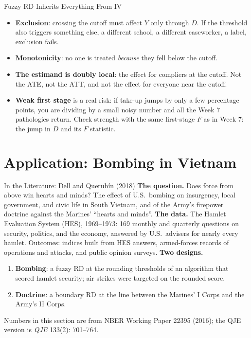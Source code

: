 \documentclass[aspectratio=169,11pt,xcolor=dvipsnames]{beamer}
\newcommand{\core}{\,\raisebox{0.6pt}{\textcolor{corestar}{$\bigstar$}}}
\begin{document}
\begin{frame}{Fuzzy RD Inherits Everything From IV\core}
\begin{itemize}\itemsep3pt
  \item \textbf{Exclusion}: crossing the cutoff must affect $Y$ only through $D$.
        If the threshold also triggers something else, a different school, a
        different caseworker, a label, exclusion fails.
  \item \textbf{Monotonicity}: no one is treated \emph{because} they fell below
        the cutoff.
  \item \textbf{The estimand is doubly local}: the effect for \alert{compliers at
        the cutoff}. Not the ATE, not the ATT, and not the effect for everyone
        near the cutoff.
  \item \textbf{Weak first stage} is a real risk: if take-up jumps by only a few
        percentage points, you are dividing by a small noisy number and all the
        Week 7 pathologies return. Check strength with the same first-stage $F$
        as in Week 7: the jump in $D$ and its $F$ statistic.
\end{itemize}
\end{frame}

\section[Vietnam]{Application: Bombing in Vietnam}
\begin{frame}\sectionpage\end{frame}

\begin{frame}{In the Literature: Dell and Querubín (2018)}
\textbf{The question.} Does force from above win hearts and minds? The effect of
U.S.\ bombing on insurgency, local government, and civic life in South Vietnam,
and of the Army's firepower doctrine against the Marines' ``hearts and minds''.
\vskip3pt
\textbf{The data.} The Hamlet Evaluation System (HES), 1969--1973: 169 monthly
and quarterly questions on security, politics, and the economy, answered by
U.S.\ advisers for nearly every hamlet. Outcomes: indices built from HES
answers, armed-forces records of operations and attacks, and public opinion
surveys.
\vskip3pt
\textbf{Two designs.}
\begin{enumerate}\itemsep1pt
  \item \textbf{Bombing}: a fuzzy RD at the rounding thresholds of an algorithm
        that scored hamlet security; air strikes were targeted on the rounded score.
  \item \textbf{Doctrine}: a boundary RD at the line between the Marines' I Corps
        and the Army's II Corps.
\end{enumerate}
\vskip3pt
{\footnotesize Numbers in this section are from NBER Working Paper 22395 (2016);
the QJE version is \emph{QJE} 133(2): 701--764.}
\end{frame}
\end{document}
